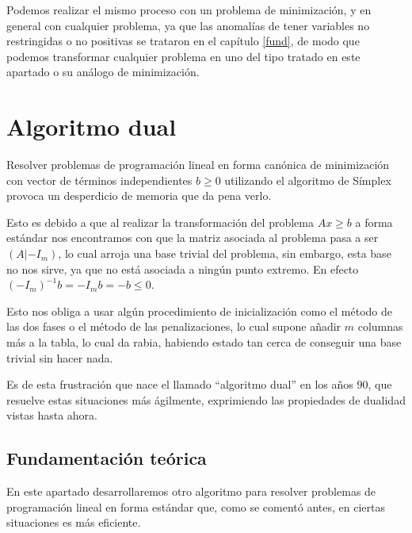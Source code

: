   Podemos realizar el mismo proceso con un problema de minimización, y en general con cualquier problema, ya que las anomalías de tener variables no restringidas o no positivas se trataron en el capítulo \ref{fund}, de modo que podemos transformar cualquier problema en uno del tipo tratado en este apartado o su análogo de minimización.
\section{Algoritmo dual}
Resolver problemas de programación lineal en forma canónica de minimización con vector de términos independientes $b\geq 0$ utilizando el algoritmo de Símplex provoca un desperdicio de memoria que da pena verlo.

Esto es debido a que al realizar la transformación del problema $Ax\geq b$ a forma estándar nos encontramos con que la matriz asociada al problema pasa a ser $(A|-I_m)$, lo cual arroja una base trivial del problema, sin embargo, esta base no nos sirve, ya que no está asociada a ningún punto extremo. En efecto $(-I_m)^{-1}b=-I_mb=-b\leq 0$.

Esto nos obliga a usar algún procedimiento de inicialización como el método de las dos fases o el método de las penalizaciones, lo cual supone añadir $m$ columnas más a la tabla, lo cual da rabia, habiendo estado tan cerca de conseguir una base trivial sin hacer nada.

Es de esta frustración que nace el llamado ``algoritmo dual'' en los años $90$, que resuelve estas situaciones más ágilmente, exprimiendo las propiedades de dualidad vistas hasta ahora.
\subsection{Fundamentación teórica}
En este apartado desarrollaremos otro algoritmo para resolver problemas de programación lineal en forma estándar que, como se comentó antes, en ciertas situaciones es más eficiente.

